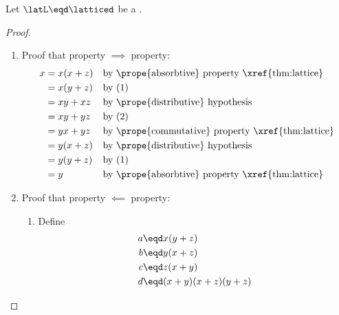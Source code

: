 \begin{theorem}
\label{thm:latd_char_cancel}
\label{thm:lat_distrib_a=b}
Let $\latL\eqd\latticed$ be a .
\end{theorem}
\begin{proof}
\begin{enumerate}
  \item Proof that  property $\implies$  property:
    \begin{align*}
      x
        &= x(x+z)
        && \text{by \prope{absorbtive} property \xref{thm:lattice}}
      \\&= x(y+z)
        && \text{by (1)}
      \\&= xy+xz
        && \text{by \prope{distributive} hypothesis}
      \\&= xy+yz
        && \text{by (2)}
      \\&= yx+yz
        && \text{by \prope{commutative} property \xref{thm:lattice}}
      \\&= y(x+z)
        && \text{by \prope{distributive} hypothesis}
      \\&= y(y+z)
        && \text{by (1)}
      \\&= y
        && \text{by \prope{absorbtive} property \xref{thm:lattice}}
    \end{align*}

  \item Proof that  property $\impliedby$  property:
    \begin{enumerate}
      \item Define \label{item:cancel_abcd}
        \begin{align*}
          a &\eqd x(y+z) \\
          b &\eqd y(x+z) \\
          c &\eqd z(x+y) \\
          d &\eqd (x+y)(x+z)(y+z)
        \end{align*}


\end{enumerate}
\end{enumerate}
\end{proof}
